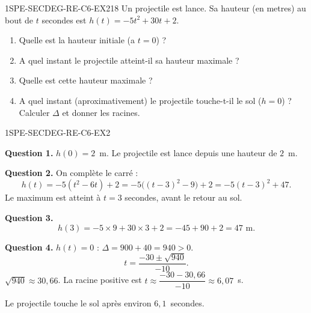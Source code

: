 
\begin{exercice}{1SPE-SECDEG-RE-C6-EX2}{1}{8}
Un projectile est lance. Sa hauteur (en metres) au bout de $t$ secondes est $h(t) = -5t^2 + 30t + 2$.
\begin{enumerate}
  \item Quelle est la hauteur initiale (a $t = 0$) ?
  \item A quel instant le projectile atteint-il sa hauteur maximale ?
  \item Quelle est cette hauteur maximale ?
  \item A quel instant (aproximativement) le projectile touche-t-il le sol ($h = 0$) ? Calculer $\Delta$ et donner les racines.
\end{enumerate}
\end{exercice}



\begin{corrige}{1SPE-SECDEG-RE-C6-EX2}

\textbf{Question 1.} $h(0) = 2$~m. Le projectile est lance depuis une hauteur de $2$~m.


\textbf{Question 2.} On complète le carré :
\[
h(t)=-5(t^2-6t)+2=-5\bigl((t-3)^2-9\bigr)+2=-5(t-3)^2+47.
\]
Le maximum est atteint à $t=3$ secondes, avant le retour au sol.

\textbf{Question 3.}
\[
h(3) = -5 \times 9 + 30 \times 3 + 2 = -45 + 90 + 2 = 47 \text{ m}.
\]

\textbf{Question 4.} $h(t) = 0$ : $\Delta = 900 + 40 = 940 > 0$.
\[
t = \frac{-30 \pm \sqrt{940}}{-10}.
\]
$\sqrt{940} \approx 30{,}66$. La racine positive est $t \approx \dfrac{-30 - 30{,}66}{-10} \approx 6{,}07$~s.

Le projectile touche le sol après environ $6{,}1$~secondes.

\end{corrige}

